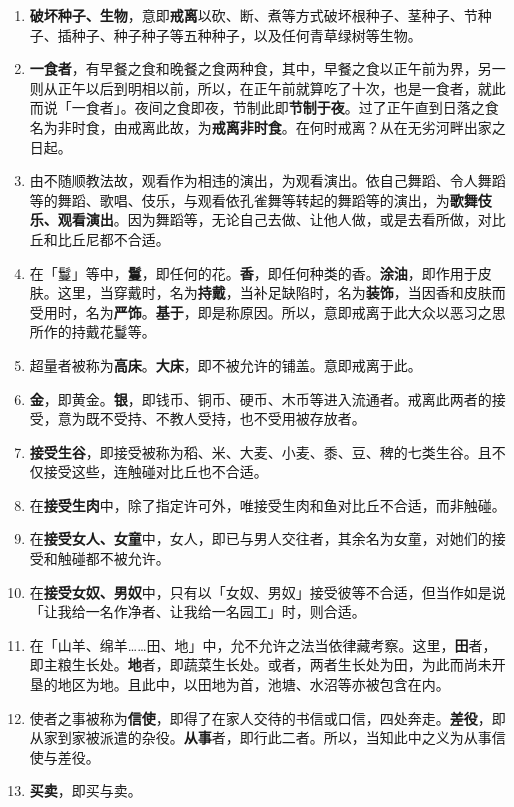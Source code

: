 \begin{enumerate}\item \textbf{破坏种子、生物}，意即\textbf{戒离}以砍、断、煮等方式破坏根种子、茎种子、节种子、插种子、种子种子等五种种子，以及任何青草绿树等生物。
\item \textbf{一食者}，有早餐之食和晚餐之食两种食，其中，早餐之食以正午前为界，另一则从正午以后到明相以前，所以，在正午前就算吃了十次，也是一食者，就此而说「一食者」。夜间之食即夜，节制此即\textbf{节制于夜}。过了正午直到日落之食名为非时食，由戒离此故，为\textbf{戒离非时食}。在何时戒离？从在无劣河畔出家之日起。
\item 由不随顺教法故，观看作为相违的演出，为观看演出。依自己舞蹈、令人舞蹈等的舞蹈、歌唱、伎乐，与观看依孔雀舞等转起的舞蹈等的演出，为\textbf{歌舞伎乐、观看演出}。因为舞蹈等，无论自己去做、让他人做，或是去看所做，对比丘和比丘尼都不合适。
\item 在「鬘」等中，\textbf{鬘}，即任何的花。\textbf{香}，即任何种类的香。\textbf{涂油}，即作用于皮肤。这里，当穿戴时，名为\textbf{持戴}，当补足缺陷时，名为\textbf{装饰}，当因香和皮肤而受用时，名为\textbf{严饰}。\textbf{基于}，即是称原因。所以，意即戒离于此大众以恶习之思所作的持戴花鬘等。
\item 超量者被称为\textbf{高床}。\textbf{大床}，即不被允许的铺盖。意即戒离于此。
\item \textbf{金}，即黄金。\textbf{银}，即钱币、铜币、硬币、木币等进入流通者。戒离此两者的接受，意为既不受持、不教人受持，也不受用被存放者。
\item \textbf{接受生谷}，即接受被称为稻、米、大麦、小麦、黍、豆、稗的七类生谷。且不仅接受这些，连触碰对比丘也不合适。
\item 在\textbf{接受生肉}中，除了指定许可外，唯接受生肉和鱼对比丘不合适，而非触碰。
\item 在\textbf{接受女人、女童}中，女人，即已与男人交往者，其余名为女童，对她们的接受和触碰都不被允许。
\item 在\textbf{接受女奴、男奴}中，只有以「女奴、男奴」接受彼等不合适，但当作如是说「让我给一名作净者、让我给一名园工」时，则合适。
\item 在「山羊、绵羊……田、地」中，允不允许之法当依律藏考察。这里，\textbf{田}者，即主粮生长处。\textbf{地}者，即蔬菜生长处。或者，两者生长处为田，为此而尚未开垦的地区为地。且此中，以田地为首，池塘、水沼等亦被包含在内。
\item 使者之事被称为\textbf{信使}，即得了在家人交待的书信或口信，四处奔走。\textbf{差役}，即从家到家被派遣的杂役。\textbf{从事}者，即行此二者。所以，当知此中之义为从事信使与差役。
\item \textbf{买卖}，即买与卖。

\end{enumerate}
